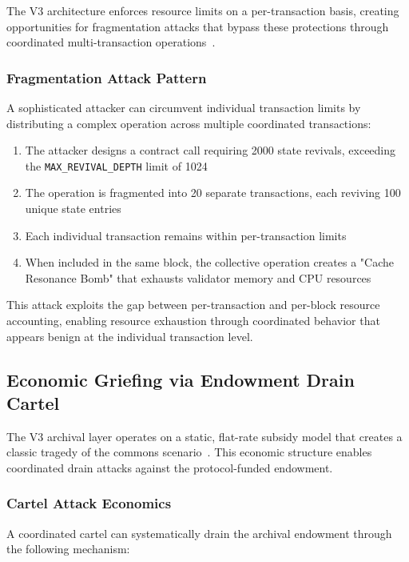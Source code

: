 \documentclass{article}
\begin{document}
The V3 architecture enforces resource limits on a per-transaction basis, creating opportunities for fragmentation attacks that bypass these protections through coordinated multi-transaction operations~\cite{chen2021bubble}.

\subsubsection{Fragmentation Attack Pattern}

A sophisticated attacker can circumvent individual transaction limits by distributing a complex operation across multiple coordinated transactions:

\begin{enumerate}
\item The attacker designs a contract call requiring 2000 state revivals, exceeding the \texttt{MAX\_REVIVAL\_DEPTH} limit of 1024
\item The operation is fragmented into 20 separate transactions, each reviving 100 unique state entries
\item Each individual transaction remains within per-transaction limits
\item When included in the same block, the collective operation creates a "Cache Resonance Bomb" that exhausts validator memory and CPU resources
\end{enumerate}

This attack exploits the gap between per-transaction and per-block resource accounting, enabling resource exhaustion through coordinated behavior that appears benign at the individual transaction level.

\subsection{Economic Griefing via Endowment Drain Cartel}

The V3 archival layer operates on a static, flat-rate subsidy model that creates a classic tragedy of the commons scenario~\cite{hardin1968tragedy}. This economic structure enables coordinated drain attacks against the protocol-funded endowment.

\subsubsection{Cartel Attack Economics}

A coordinated cartel can systematically drain the archival endowment through the following mechanism:
\end{document}
